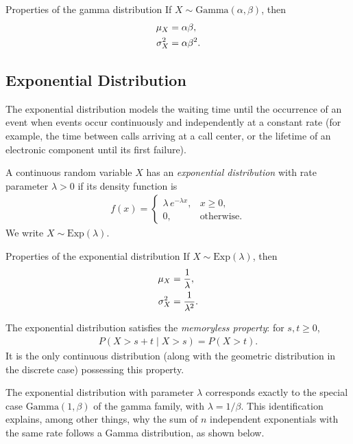 {Properties of the gamma distribution} If $X \sim \text{Gamma}(\alpha, \beta)$, then
\begin{align}
 \mu_X &= \alpha\beta, \\
 \sigma_X^2 &= \alpha\beta^2.
\end{align}

\subsection{Exponential Distribution}

The exponential distribution models the waiting time until the occurrence of an event
when events occur continuously and independently at a constant rate (for example, the
time between calls arriving at a call center, or the lifetime of an electronic component
until its first failure).

\begin{definicion}
A continuous random variable $X$ has an \emph{exponential distribution} with rate
parameter $\lambda > 0$ if its density function is
\begin{align}
 \label{eq:2.8.8}
 f(x) =
 \begin{cases}
  \lambda\,e^{-\lambda x}, & x \geq 0, \\
  0, & \text{otherwise.}
 \end{cases}
\end{align}
We write $X \sim \text{Exp}(\lambda)$.
\end{definicion}

{Properties of the exponential distribution} If $X \sim \text{Exp}(\lambda)$, then
\begin{align}
 \mu_X &= \frac{1}{\lambda}, \\
 \sigma_X^2 &= \frac{1}{\lambda^2}.
\end{align}

\begin{observacion}
The exponential distribution satisfies the \emph{memoryless property}: for $s, t \geq 0$,
\begin{align}
 P(X > s + t \mid X > s) = P(X > t).
\end{align}
It is the only continuous distribution (along with the geometric distribution in the discrete case) possessing this property.
\end{observacion}

The exponential distribution with parameter $\lambda$ corresponds exactly to the special
case $\text{Gamma}(1, \beta)$ of the gamma family, with $\lambda = 1/\beta$. This
identification explains, among other things, why the sum of $n$ independent
exponentials with the same rate follows a Gamma distribution, as shown below.


